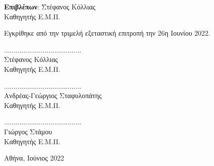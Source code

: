 \begin{titlepage}
\begin{center}
\begin{flushleft}
\begin{tabbing}
            \textbf{Επιβλέπων}: \= Στέφανος Κόλλιας \\
                                \> Καθηγητής Ε.Μ.Π.
        \end{tabbing}
        \end{flushleft}
        \vspace{0.5cm}
        Εγκρίθηκε από την τριμελή εξεταστική επιτροπή την 26η Ιουνίου 2022.
        \vspace{1cm}

        \large
        \parbox[t]{0.3\textwidth} {
            \center
            ........................................ \\
            Στέφανος Κόλλιας \\
            Καθηγητής Ε.Μ.Π.
        }
        \parbox[t]{0.3\textwidth} {
            \center
            ........................................ \\
            Ανδρέας-Γεώργιος Σταφυλοπάτης  \\
            Καθηγητής Ε.Μ.Π.
        }
        \parbox[t]{0.3\textwidth} {
            \center
            ........................................ \\
            Γιώργος Στάμου  \\
            Καθηγητής Ε.Μ.Π.
        }


            
        \vspace{1.5cm}
            

        \Large

        Αθήνα, Ιούνιος 2022
            
    \end{center}
\end{titlepage}
